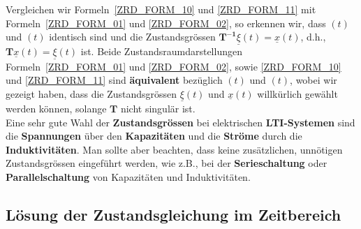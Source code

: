 Vergleichen wir Formeln~\ref{ZRD_FORM_10} und \ref{ZRD_FORM_11} mit
Formeln~\ref{ZRD_FORM_01} und \ref{ZRD_FORM_02}, so erkennen wir, dass
$(t)$ und $(t)$ identisch sind und die
Zustandsgr\"ossen $\boldsymbol{
  T^{-1}}\underline{\xi}(t)=\underline{x}(t)$, d.h., $\boldsymbol{
  T}\underline{x}(t)=\underline{\xi}(t)$ ist.  Beide
Zustandsraumdarstellungen Formeln~\ref{ZRD_FORM_01} und \ref{ZRD_FORM_02},
sowie \ref{ZRD_FORM_10} und \ref{ZRD_FORM_11} sind {\bf \"aquivalent}
bez\"uglich $(t)$ und $(t)$, wobei wir gezeigt
haben, dass die Zustandsgr\"ossen $\underline{\xi}(t)$ und
$\underline{x}(t)$ willk\"urlich gew\"ahlt werden k\"onnen, solange
$\boldsymbol{T}$ nicht singul\"ar ist.\\ \nit Eine sehr gute Wahl der
{\bf Zustandsgr\"ossen} bei
elektrischen {\bf LTI-Systemen} sind die {\bf
  Spannungen} \"uber den {\bf
  Kapazit\"aten} und die {\bf
  Str\"ome} durch die {\bf
  Induktivit\"aten}. Man sollte
aber beachten, dass keine zus\"atzlichen, unn\"otigen
Zustandsgr\"ossen eingef\"uhrt werden, wie z.B., bei der {\bf
  Serieschaltung} oder {\bf Parallelschaltung} von Kapazit\"aten und Induktivit\"aten.


\subsection{L\"osung der Zustandsgleichung im Zeitbereich}
